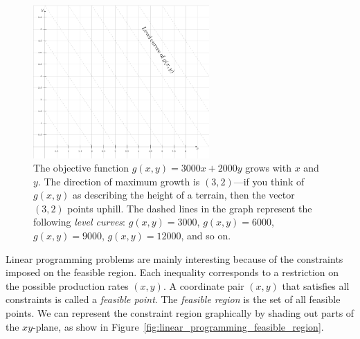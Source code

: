 \documentclass[11pt,oneside]{article}
\begin{document}
		\begin{figure}[htb]
		\begin{center}
		\includegraphics[width=0.6\textwidth]{figures/linear_algebra/linear_programming_level_curves_gxy.pdf}
		\end{center}
		\vspace{-6mm}
		\caption{The objective function $g(x,y)=3000x +  2000y$ grows with $x$ and $y$. 
				The direction of maximum growth is $(3,2)$---if you think of $g(x,y)$ 
				as describing the height of a terrain, 
				then the vector $(3,2)$ points uphill.
				The dashed lines in the graph represent the following \emph{level curves}:
				$g(x,y)=3000$, $g(x,y)=6000$, $g(x,y)=9000$, $g(x,y)=12000$, and so on.}	%
		\label{fig:linear_programming_level_curves_gxy}
		\end{figure}


	Linear programming problems are mainly interesting because of the constraints imposed on the feasible region.
	Each inequality corresponds to a restriction on the possible production rates $(x,y)$.
	A coordinate pair $(x,y)$ that satisfies all constraints is called a \emph{feasible point}.
	The \emph{feasible region} is the set of all feasible points.
	We can represent the constraint region graphically by shading out parts of the $xy$-plane,
	as show in Figure~\ref{fig:linear_programming_feasible_region}.
	
\end{document}
